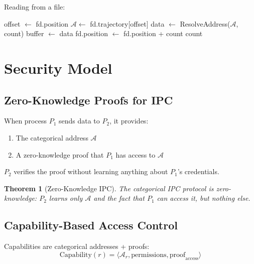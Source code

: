 \documentclass[twocolumn,10pt]{article}
\newtheorem{theorem}{Theorem}[section]
\theoremstyle{definition}
\theoremstyle{remark}
\newcommand{\cataddr}{\mathcal{A}}
\begin{document}
Reading from a file:
\begin{algorithm}
\caption{Read File}
\begin{algorithmic}[1]
    \State offset $\gets$ fd.position
    \State $\cataddr \gets$ fd.trajectory[offset]
    \State data $\gets$ ResolveAddress($\cataddr$, count)
    \State buffer $\gets$ data
    \State fd.position $\gets$ fd.position + count
    \State \Return count
\EndFunction
\end{algorithmic}
\end{algorithm}

\section{Security Model}
\label{sec:security}

\subsection{Zero-Knowledge Proofs for IPC}

When process $P_1$ sends data to $P_2$, it provides:
\begin{enumerate}
    \item The categorical address $\cataddr$
    \item A zero-knowledge proof that $P_1$ has access to $\cataddr$
\end{enumerate}

$P_2$ verifies the proof without learning anything about $P_1$'s credentials.

\begin{theorem}[Zero-Knowledge IPC]
The categorical IPC protocol is zero-knowledge: $P_2$ learns only $\cataddr$ and the fact that $P_1$ can access it, but nothing else.
\end{theorem}

\subsection{Capability-Based Access Control}

Capabilities are categorical addresses + proofs:
\begin{equation}
    \text{Capability}(r) = \langle \cataddr_r, \text{permissions}, \text{proof}_{\text{access}} \rangle
\end{equation}
\end{document}
